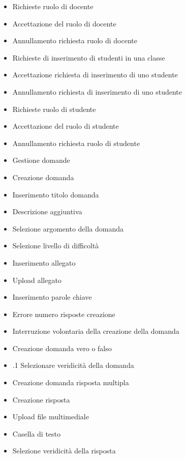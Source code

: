 \begin{itemize}
	\item {} Richieste ruolo di docente
	\item {} Accettazione del ruolo di docente
	\item {} Annullamento richiesta ruolo di docente
	\item {} Richieste di inserimento di studenti in una classe
	\item {} Accettazione richiesta di inserimento di uno studente
	\item {} Annullamento richiesta di inserimento di uno studente
	\item {} Richieste ruolo di studente
	\item {} Accettazione del ruolo di studente
	\item {} Annullamento richiesta ruolo di studente
	\item {} Gestione domande 
	\item {} Creazione domanda 
	\item {} Inserimento titolo domanda 
	\item {} Descrizione aggiuntiva
	\item {} Selezione argomento della domanda 
	\item {} Selezione livello di difficoltà 
	\item {} Inserimento allegato 
	\item {} Upload allegato 
	\item {} Inserimento parole chiave
	\item {} Errore numero risposte creazione
	\item {} Interruzione volontaria della creazione della domanda
	\item {} Creazione domanda vero o falso
	\item {}.1 Selezionare veridicità della domanda 
	\item {} Creazione domanda risposta multipla 
	\item {} Creazione risposta
	\item {} Upload file multimediale
	\item {} Casella di testo 
	\item {} Selezione veridicità della risposta

\end{itemize}

